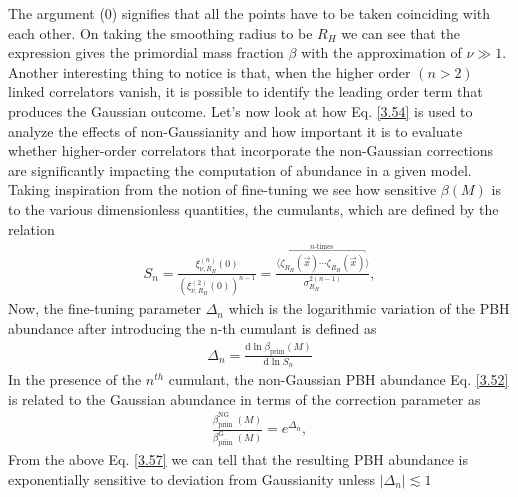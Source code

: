 The argument (0) signifies that all the points have to be taken coinciding with each other. On taking the smoothing radius to be $R_{H}$ we can see that the expression gives the primordial mass fraction $\beta$ with the approximation of $\nu \gg 1$. Another interesting thing to notice is that, when the higher order $(n > 2)$ linked correlators vanish, it is possible to identify the leading order term that produces the Gaussian outcome.
Let's now look at how Eq. \ref{3.54} is used to analyze the effects of non-Gaussianity and how important it is to evaluate whether higher-order correlators that incorporate the non-Gaussian corrections are significantly impacting the computation of abundance in a given model.\\
Taking inspiration from the notion of fine-tuning we see how sensitive $\beta(M)$ is to the various dimensionless quantities, the cumulants, which are defined by the relation
\begin{align}
    S_n=\frac{\xi_{\nu, R_H}^{(n)}(0)}{\left(\xi_{\nu, R_H}^{(2)}(0)\right)^{n-1}}=\frac{\langle\overbracket{\zeta_{R_H}(\vec{x}) \cdots \zeta_{R_H}(\vec{x})}^{n \text {-times }}\rangle}{\sigma_{R_H}^{2(n-1)}}, \label{3.55}
\end{align}
Now, the fine-tuning parameter $\Delta_{n}$ which is the logarithmic variation of the PBH abundance after introducing the n-th cumulant is defined as
\begin{align}
    \Delta_{n}=\frac{\mathrm{d} \ln \beta_{\operatorname{prim}}(M)}{\mathrm{d} \ln S_{n}} \label{3.56}
\end{align}
In the presence of the $n^{th}$ cumulant, the non-Gaussian PBH abundance Eq. \ref{3.52} is related to the Gaussian abundance in terms of the correction parameter as
\begin{align}
    \frac{\beta_{\text {prim }}^{\mathrm{NG}}(M)}{\beta_{\text {prim }}^{\mathrm{G}}(M)}=e^{\Delta_{n}} ,\label{3.57}
\end{align}
From the above Eq. \ref{3.57} we can tell that the resulting PBH abundance is exponentially sensitive to deviation from Gaussianity unless 
$
\left|\Delta_{n}\right| \lesssim 1
$
\\

